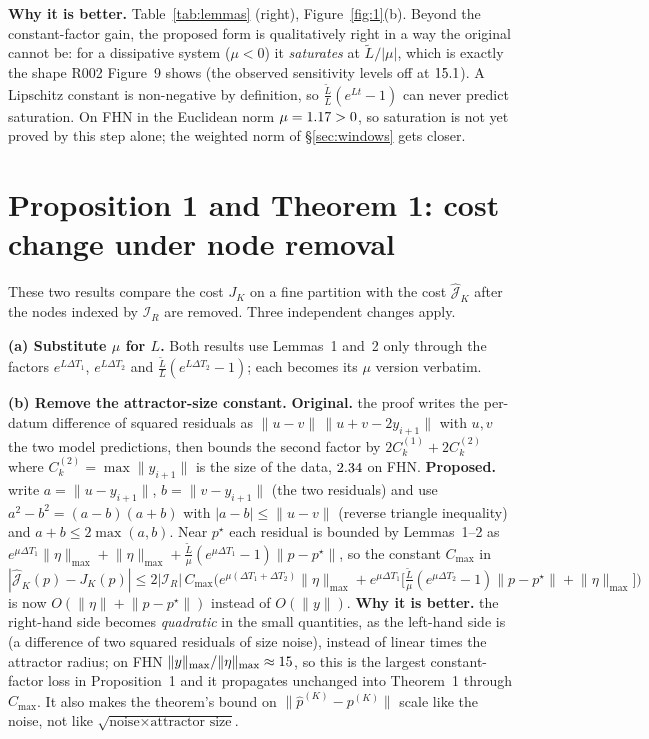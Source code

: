 \documentclass[10pt]{article}
\newcommand{\orig}[1]{\textcolor{black!60}{\textbf{Original.}} #1}
\newcommand{\prop}[1]{\textcolor{blue!60!black}{\textbf{Proposed.}} #1}
\newcommand{\gain}[1]{\textcolor{green!45!black}{\textbf{Why it is better.}} #1}
\newcommand{\norm}[1]{\lVert #1\rVert}
\begin{document}
\gain{} Table~\ref{tab:lemmas} (right), Figure~\ref{fig:1}(b). Beyond the constant-factor gain, the proposed form is qualitatively right in a way the original cannot be: for a dissipative system ($\mu<0$) it \emph{saturates} at $\tilde L/|\mu|$, which is exactly the shape R002 Figure~9 shows (the observed sensitivity levels off at $15.1$). A Lipschitz constant is non-negative by definition, so $\frac{\tilde L}{L}(e^{Lt}-1)$ can never predict saturation. On FHN in the Euclidean norm $\mu=1.17>0$, so saturation is not yet proved by this step alone; the weighted norm of \S\ref{sec:windows} gets closer.

\section{Proposition 1 and Theorem 1: cost change under node removal}
These two results compare the cost $J_K$ on a fine partition with the cost $\hat{\mathcal J}_K$ after the nodes indexed by $\mathcal I_R$ are removed. Three independent changes apply.

\textbf{(a) Substitute $\mu$ for $L$.} Both results use Lemmas~1 and~2 only through the factors $e^{L\Delta T_1}$, $e^{L\Delta T_2}$ and $\frac{\tilde L}{L}(e^{L\Delta T_2}-1)$; each becomes its $\mu$ version verbatim.

\textbf{(b) Remove the attractor-size constant.} \orig{} the proof writes the per-datum difference of squared residuals as $\norm{u-v}\,\norm{u+v-2y_{i+1}}$ with $u,v$ the two model predictions, then bounds the second factor by $2C^{(1)}_k+2C^{(2)}_k$ where $C^{(2)}_k=\max\norm{y_{i+1}}$ is the size of the data, $2.34$ on FHN. \prop{} write $a=\norm{u-y_{i+1}}$, $b=\norm{v-y_{i+1}}$ (the two residuals) and use $a^2-b^2=(a-b)(a+b)$ with $|a-b|\le\norm{u-v}$ (reverse triangle inequality) and $a+b\le 2\max(a,b)$. Near $p^\star$ each residual is bounded by Lemmas~1--2 as $e^{\mu\Delta T_1}\norm{\eta}_{\max}+\norm{\eta}_{\max}+\frac{\tilde L}{\mu}(e^{\mu\Delta T_1}-1)\norm{p-p^\star}$, so the constant $C_{\max}$ in
\[
|\hat{\mathcal J}_K(p)-J_K(p)|\le 2|\mathcal I_R|\,C_{\max}\Big(e^{\mu(\Delta T_1+\Delta T_2)}\norm{\eta}_{\max}+e^{\mu\Delta T_1}\big[\tfrac{\tilde L}{\mu}(e^{\mu\Delta T_2}-1)\norm{p-p^\star}+\norm{\eta}_{\max}\big]\Big)
\]
is now $O(\norm\eta+\norm{p-p^\star})$ instead of $O(\norm y)$. \gain{} the right-hand side becomes \emph{quadratic} in the small quantities, as the left-hand side is (a difference of two squared residuals of size noise), instead of linear times the attractor radius; on FHN $\norm{y}_{\max}/\norm{\eta}_{\max}\approx\cattractoroverone$, so this is the largest constant-factor loss in Proposition~1 and it propagates unchanged into Theorem~1 through $C_{\max}$. It also makes the theorem's bound on $\norm{\hat p^{(K)}-p^{(K)}}$ scale like the noise, not like $\sqrt{\text{noise}\times\text{attractor size}}$.
\end{document}
